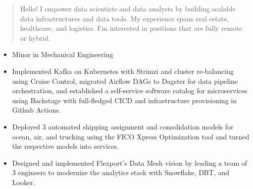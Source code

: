 \documentclass[10pt,a4paper,ragged2e,withhyper]{altacv}
\begin{document}
\begin{paracol}{2}



  \newpage

  \switchcolumn

  \begin{quote}
    Hello! I empower data scientists and data analysts by building scalable data infrastructures and data tools. My experience spans real estate, healthcare, and logistics. I'm interested in positions that are fully remote or hybrid.
  \end{quote}
  \begin{itemize}
    \item Minor in Mechanical Engineering
  \end{itemize}
  \begin{itemize}
    \item Implemented Kafka on Kubernetes with Strimzi and cluster re-balancing using Cruise Control, migrated Airflow DAGs to Dagster for data pipeline orchestration, and established a self-service software catalog for microservices using Backstage with full-fledged CICD and infrastructure provisioning in Github Actions.
    \item Deployed 3 automated shipping assignment and consolidation models for ocean, air, and trucking using the FICO Xpress Optimization tool and turned the respective models into services.
    \item Designed and implemented Flexport's Data Mesh vision by leading a team of 3 engineers to modernize the analytics stack with Snowflake, DBT, and Looker.
  \end{itemize}
  \divider


\end{paracol}
\end{document}
